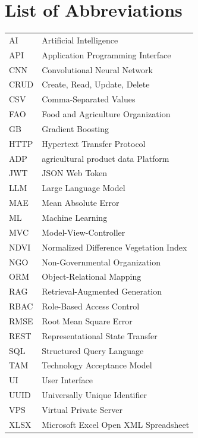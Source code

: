 \documentclass[12pt,a4paper,oneside]{report}
\begin{document}
\listoffigures
\newpage

\listoftables
\newpage

\chapter*{List of Abbreviations}
\begin{tabular}{ll}
AI     & Artificial Intelligence \\
API    & Application Programming Interface \\
CNN    & Convolutional Neural Network \\
CRUD   & Create, Read, Update, Delete \\
CSV    & Comma-Separated Values \\
FAO    & Food and Agriculture Organization \\
GB     & Gradient Boosting \\
HTTP   & Hypertext Transfer Protocol \\
ADP   & agricultural product data Platform \\
JWT    & JSON Web Token \\
LLM    & Large Language Model \\
MAE    & Mean Absolute Error \\
ML     & Machine Learning \\
MVC    & Model-View-Controller \\
NDVI   & Normalized Difference Vegetation Index \\
NGO    & Non-Governmental Organization \\
ORM    & Object-Relational Mapping \\
RAG    & Retrieval-Augmented Generation \\
RBAC   & Role-Based Access Control \\
RMSE   & Root Mean Square Error \\
REST   & Representational State Transfer \\
SQL    & Structured Query Language \\
TAM    & Technology Acceptance Model \\
UI     & User Interface \\
UUID   & Universally Unique Identifier \\
VPS    & Virtual Private Server \\
XLSX   & Microsoft Excel Open XML Spreadsheet \\
\end{tabular}
\newpage
\end{document}
